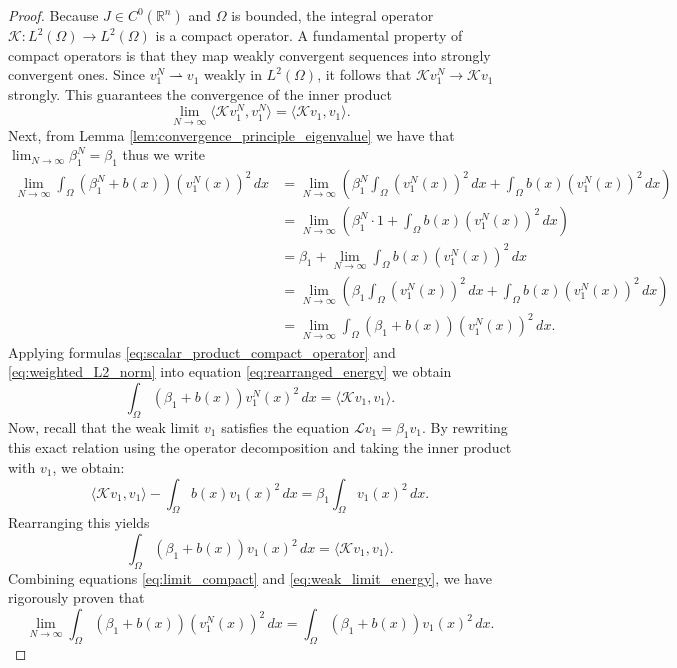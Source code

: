 \documentclass[11pt, a4paper]{article}
\theoremstyle{break}
\theoremstyle{break}
\theoremstyle{break}
\theoremstyle{break}
\theoremstyle{break}
\theoremstyle{break}
\theoremstyle{break}
\theoremstyle{break}
\theoremstyle{break}
\begin{document}
\begin{proof}
    Because $J \in C^0(\mathbb{R}^n)$ and $\Omega$ is bounded, the integral operator $\mathcal{K} : L^2(\Omega) \to L^2(\Omega)$ is a compact operator. A fundamental property of compact operators is that they map weakly convergent sequences into strongly convergent ones. Since $v_1^N \rightharpoonup v_1$ weakly in $L^2(\Omega)$, it follows that $\mathcal{K} v_1^N \to \mathcal{K} v_1$ strongly. This guarantees the convergence of the inner product
    \begin{equation}
        \label{eq:scalar_product_compact_operator}
        \lim_{N \to \infty} \langle \mathcal{K} v_1^N, v_1^N \rangle = \langle \mathcal{K} v_1, v_1 \rangle.
    \end{equation}
    Next, from Lemma \ref{lem:convergence_principle_eigenvalue} we have that $\lim_{N \to \infty} \beta_1^N = \beta_1$ thus we write
    \begin{align}
        \lim_{N \to \infty} \int_\Omega (\beta_1^N + b(x)) (v_1^N(x))^2 \, dx 
        &= \lim_{N \to \infty} \left( \beta_1^N \int_\Omega (v_1^N(x))^2 \, dx + \int_\Omega b(x) (v_1^N(x))^2 \, dx \right) \nonumber \\
        &= \lim_{N \to \infty} \left( \beta_1^N \cdot 1 + \int_\Omega b(x) (v_1^N(x))^2 \, dx \right) \nonumber \\
        &= \beta_1 + \lim_{N \to \infty} \int_\Omega b(x) (v_1^N(x))^2 \, dx \nonumber \\
        &= \lim_{N \to \infty} \left( \beta_1 \int_\Omega (v_1^N(x))^2 \, dx + \int_\Omega b(x) (v_1^N(x))^2 \, dx \right) \nonumber \\
        &= \lim_{N \to \infty} \int_\Omega (\beta_1 + b(x)) (v_1^N(x))^2 \, dx.
        \label{eq:weighted_L2_norm}
    \end{align}
    Applying formulas \eqref{eq:scalar_product_compact_operator} and \eqref{eq:weighted_L2_norm} into equation \eqref{eq:rearranged_energy} we obtain
    \begin{equation} 
        \label{eq:limit_compact}
        \int_\Omega (\beta_1 + b(x)) v_1^N(x)^2 \, dx = \langle \mathcal{K} v_1, v_1 \rangle.
    \end{equation}
    Now, recall that the weak limit $v_1$ satisfies the equation $\mathcal{L} v_1 = \beta_1 v_1$. By rewriting this exact relation using the operator decomposition and taking the inner product with $v_1$, we obtain:
    \begin{equation}
        \langle \mathcal{K} v_1, v_1 \rangle - \int_\Omega b(x) v_1(x)^2 \, dx = \beta_1 \int_\Omega v_1(x)^2 \, dx.
    \end{equation}
    Rearranging this yields
    \begin{equation} \label{eq:weak_limit_energy}
        \int_\Omega (\beta_1 + b(x)) v_1(x)^2 \, dx = \langle \mathcal{K} v_1, v_1 \rangle.
    \end{equation}
    Combining equations \eqref{eq:limit_compact} and \eqref{eq:weak_limit_energy}, we have rigorously proven that
    \begin{equation} \label{eq:norm_convergence}
        \lim_{N \to \infty} \int_\Omega (\beta_1 + b(x)) (v_1^N(x))^2 \, dx = \int_\Omega (\beta_1 + b(x)) v_1(x)^2 \, dx.
    \end{equation}
    

\end{proof}
\end{document}
